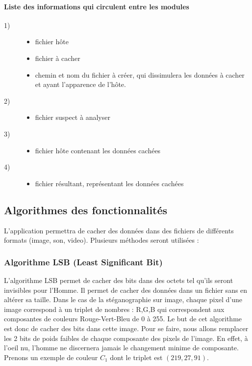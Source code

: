 \documentclass[11pt]{article}
\begin{document}
\paragraph{Liste des informations qui circulent entre les modules}
\begin{description}
\item[1)] 
\begin{itemize}
\item fichier hôte 
\item fichier à cacher 
\item chemin et nom du fichier à créer, qui dissimulera les données à cacher et ayant l'apparence de l'hôte. 
\end{itemize}
\item[2)] 
\begin{itemize}
\item fichier suspect à analyser
\end{itemize}
\item[3)] 
\begin{itemize}
\item fichier hôte contenant les données cachées 
\end{itemize}
\item[4)]
\begin{itemize}
\item fichier résultant, représentant les données cachées 
\end{itemize}
\end{description}

\subsection{Algorithmes des fonctionnalités}
L'application permettra de cacher des données dans des fichiers de différents formats (image, son, video). 
Plusieurs méthodes seront utilisées : 

\subsubsection{Algorithme LSB (Least Significant Bit)}
L'algorithme LSB permet de cacher des bits dans des octets tel qu'ils seront invisibles pour l'Homme. 
Il permet de cacher des données dans un fichier sans en altérer sa taille. 
Dans le cas de la stéganographie sur image, chaque pixel d'une image correspond à un triplet de nombres : R,G,B qui correspondent aux composantes de couleurs Rouge-Vert-Bleu de 0 à 255. 
Le but de cet algorithme est donc de cacher des bits dans cette image. Pour se faire, nous allons remplacer les 2 bits de poids faibles de chaque composante des pixels de l'image. 
En effet, à l'oeil nu, l'homme ne discernera jamais le changement minime de composante. 
Prenons un exemple de couleur $C_1$ dont le triplet est $(219,27,91)$. 
\end{document}
